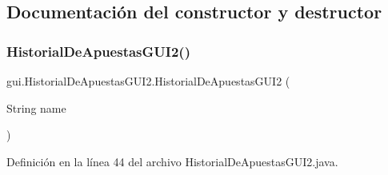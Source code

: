 \subsection{Documentación del constructor y destructor}
\mbox{\label{classgui_1_1HistorialDeApuestasGUI2_a414d7719dcd081f273de8bfcf59a46ce}} 
\subsubsection{\texorpdfstring{HistorialDeApuestasGUI2()}{HistorialDeApuestasGUI2()}}
{\footnotesize\ttfamily gui.\+Historial\+De\+Apuestas\+G\+U\+I2.\+Historial\+De\+Apuestas\+G\+U\+I2 (\begin{DoxyParamCaption}\item[{String}]{name }\end{DoxyParamCaption})}



Definición en la línea 44 del archivo Historial\+De\+Apuestas\+G\+U\+I2.\+java.


